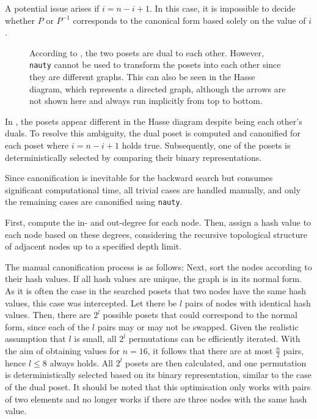 \documentclass[twoside,leqno,twocolumn]{article}
\begin{document}
A potential issue arises if $i = n - i + 1$.
In this case, it is impossible to decide whether $P$ or $P^{-1}$ corresponds to the canonical form based solely on the value of $i$.

\begin{figure}[!b]
  \centering
  
  \caption{According to , the two posets are dual to each other.
    However, \texttt{nauty} cannot be used to transform the posets into each other since they are different graphs.
    This can also be seen in the Hasse diagram, which represents a directed graph, although the arrows are not shown here and always run implicitly from top to bottom.}
  \label{fig:backward_canonify_problematic}
\end{figure}

In , the posets appear different in the Hasse diagram despite being each other's duals.
To resolve this ambiguity, the dual poset is computed and canonified for each poset where $i = n - i + 1$ holds true.
Subsequently, one of the posets is deterministically selected by comparing their binary representations.

Since canonification is inevitable for the backward search but consumes significant computational time, all trivial cases are handled manually, and only the remaining cases are canonified using \texttt{nauty}.

First, compute the in- and out-degree for each node.
Then, assign a hash value to each node based on these degrees, considering the recursive topological structure of adjacent nodes up to a specified depth limit.

The manual canonification process is as follows:
Next, sort the nodes according to their hash values.
If all hash values are unique, the graph is in its normal form.
As it is often the case in the searched posets that two nodes have the same hash values, this case was intercepted.
Let there be $l$ pairs of nodes with identical hash values.
Then, there are $2^l$ possible posets that could correspond to the normal form, since each of the $l$ pairs may or may not be swapped.
Given the realistic assumption that $l$ is small, all $2^l$ permutations can be efficiently iterated.
With the aim of obtaining values for $n = 16$, it follows that there are at most $\frac{n}{2}$ pairs, hence $l \leq 8$ always holds.
All $2^l$ posets are then calculated, and one permutation is deterministically selected based on its binary representation, similar to the case of the dual poset.
It should be noted that this optimisation only works with pairs of two elements and no longer works if there are three nodes with the same hash value.
\end{document}
